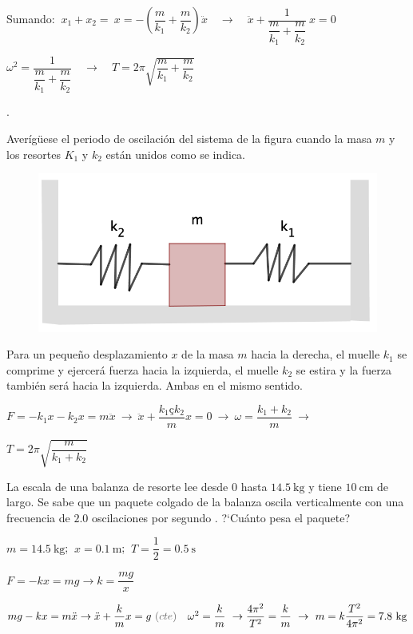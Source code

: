 Sumando: $\ x_1+x_2 =\ x=-\left( \dfrac {m}{k_1} + \dfrac{m}{k_2} \right) \ddot{x} \quad \to \quad \ddot{x}+\dfrac {1}{\dfrac {m}{k_1} + \dfrac{m}{k_2}} \ x = 0$

$\omega^2 = \dfrac {1}{\dfrac {m}{k_1} + \dfrac{m}{k_2}} \quad \to \quad T=2\pi \sqrt{\dfrac{m}{k_1}+\dfrac{m}{k_2}}$ 

\vspace{5mm}%
\begin{prob}.

\begin{multicols}{2}
Averígüese el periodo de oscilación del sistema de la figura cuando la masa $m$ y los resortes $K_1$ y $k_2$ están unidos como se indica.
\begin{figure}[H]
		\centering
		\includegraphics[width=.4\textwidth]{imagenes/imagenes21/T21IM13.png}
	\end{figure}	
\end{multicols}
\end{prob}

Para un pequeño desplazamiento $x$ de la masa $m$ hacia la derecha, el muelle $k_1$ se comprime y ejercerá fuerza hacia la izquierda, el muelle $k_2$ se estira y la fuerza también será hacia la izquierda. Ambas en el mismo sentido.

$F=-k_1x-k_2x=m\ddot{x} \ \to \ \ddot{x}+\dfrac{k_1çk_2}{m}x=0 \ \to \ \omega=\dfrac{k_1+k_2}{m} \ \to $

$ T=2\pi \sqrt{\dfrac{m}{k_1+k_2}}$

\begin{prob}
La escala de una balanza de resorte lee desde $0$ hasta $14.5\ \mathrm{kg}$ y tiene $10\ \mathrm{cm}$ de largo. Se sabe que un paquete colgado de la balanza oscila verticalmente con una frecuencia de $2.0$ oscilaciones por segundo	. ?`Cuánto pesa el paquete?
\end{prob}

$m=14.5\ \mathrm{kg}$; $\ x=0.1\ \mathrm{m}$; $\ T=\dfrac 1 2= 0.5 \ \mathrm{s}$

$F=-kx=mg \to k=\dfrac{mg}{x}$

$mg-kx=m\ddot{x} \to \ddot{x}+\dfrac{k}{m}x=g\ \textcolor{gris}{(cte)} \quad \omega^2=\dfrac k m \ \to \dfrac{4\pi^2}{T^2}=\dfrac k m \ \to \ m=k\dfrac{T^2}{4\pi^2} = 7.8\ \mathrm{kg}$

